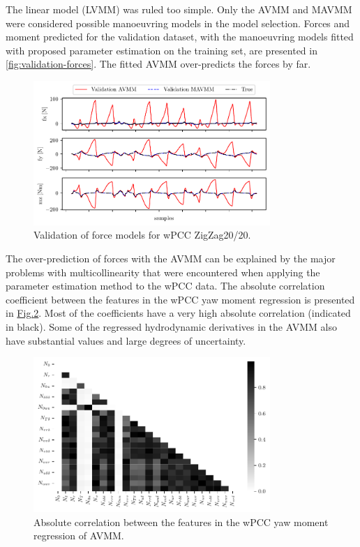 \noindent The linear model (LVMM) was ruled too simple. Only the AVMM and MAVMM were considered possible manoeuvring models in the model selection.
Forces and moment predicted for the validation dataset, with the manoeuvring models fitted with proposed parameter estimation on the training set, are presented in \autoref{fig:validation-forces}. The fitted AVMM over-predicts the forces by far. 
\begin{figure}[h!]
\centering
\includegraphics[width=0.8\textwidth]{kappa/images/7.pdf}
\caption{Validation of force models for wPCC ZigZag20/20.}\label{fig:validation-forces}
\end{figure}
\noindent The over-prediction of forces with the AVMM can be explained by the major problems with multicollinearity that were encountered when applying the parameter estimation method to the wPCC data. The absolute correlation coefficient between the features in the wPCC yaw moment regression is presented in \hyperref[\detokenize{06.10_results_wpcc:fig-ncorr}]{Fig.\@ \ref{\detokenize{06.10_results_wpcc:fig-ncorr}}}. Most of the coefficients have a very high absolute correlation (indicated in black). Some of the regressed hydrodynamic derivatives in the AVMM also have substantial values and large degrees of uncertainty.
\begin{figure}[ht!]
\centering
\includegraphics[width=0.8\textwidth]{kappa/images/10.pdf}
\caption{Absolute correlation between the features in the wPCC yaw moment regression of AVMM.}\label{\detokenize{06.10_results_wpcc:fig-ncorr}}\end{figure}
